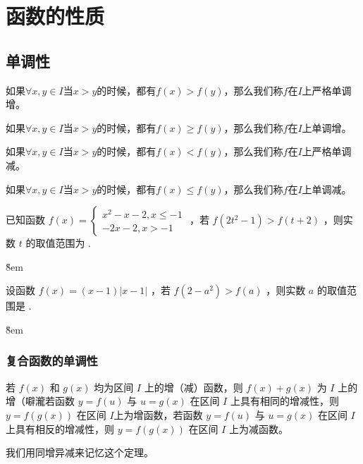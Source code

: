 \section{函数的性质}

\subsection{单调性}

\begin{definition}[单调性]
    如果$\forall x,y \in I$当$x>y$的时候，都有$f(x)>f(y)$，那么我们称$f$在$I$上严格单调增。

    如果$\forall x,y \in I$当$x>y$的时候，都有$f(x)\geq f(y)$，那么我们称$f$在$I$上单调增。

    如果$\forall x,y \in I$当$x>y$的时候，都有$f(x)<f(y)$，那么我们称$f$在$I$上严格单调减。

    如果$\forall x,y \in I$当$x>y$的时候，都有$f(x)\leq f(y)$，那么我们称$f$在$I$上单调减。
\end{definition}

\begin{example}
    已知函数 $f(x)=\left\{\begin{array}{l}x^2-x-2, x \leq-1 \\ -2 x-2, x>-1\end{array}\right.$ ，若 $f\left(2 t^2-1\right)>f(t+2)$ ，则实数 $t$ 的取值范围为 \underline{\qquad}.
\end{example}

\v{8em}

\begin{example}
    设函数 $f(x)=(x-1)|x-1|$ ，若 $f\left(2-a^2\right)>f(a)$ ，则实数 $a$ 的取值范围是 \underline{\qquad}.
\end{example}

\v{8em}

\subsubsection{复合函数的单调性}

\begin{theorem}[复合函数的单调性]
    若 $f(x)$ 和 $g(x)$ 均为区间 $I$ 上的增（减）函数，则 $f(x)+g(x)$ 为 $I$ 上的增（噼瀧若函数 $y=f(u)$ 与 $u=g(x)$ 在区间 $I$ 上具有相同的增减性，则 $y=f(g(x))$ 在区间 $I$上为增函数，若函数 $y=f(u)$ 与 $u=g(x)$ 在区间 $I$ 上具有相反的增减性，则 $y=f(g(x))$ 在区间 $I$ 上为减函数。
    \begin{tips}
        我们用同增异减来记忆这个定理。
    \end{tips}
\end{theorem}
